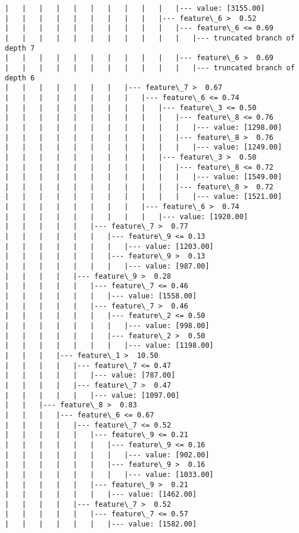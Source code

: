 \documentclass[11pt]{article}
\begin{document}
\begin{Verbatim}[commandchars=\\\{\}]
|   |   |   |   |   |   |   |   |   |   |--- value: [3155.00]
|   |   |   |   |   |   |   |   |   |--- feature\_6 >  0.52
|   |   |   |   |   |   |   |   |   |   |--- feature\_6 <= 0.69
|   |   |   |   |   |   |   |   |   |   |   |--- truncated branch of depth 7
|   |   |   |   |   |   |   |   |   |   |--- feature\_6 >  0.69
|   |   |   |   |   |   |   |   |   |   |   |--- truncated branch of depth 6
|   |   |   |   |   |   |   |--- feature\_7 >  0.67
|   |   |   |   |   |   |   |   |--- feature\_6 <= 0.74
|   |   |   |   |   |   |   |   |   |--- feature\_3 <= 0.50
|   |   |   |   |   |   |   |   |   |   |--- feature\_8 <= 0.76
|   |   |   |   |   |   |   |   |   |   |   |--- value: [1298.00]
|   |   |   |   |   |   |   |   |   |   |--- feature\_8 >  0.76
|   |   |   |   |   |   |   |   |   |   |   |--- value: [1249.00]
|   |   |   |   |   |   |   |   |   |--- feature\_3 >  0.50
|   |   |   |   |   |   |   |   |   |   |--- feature\_8 <= 0.72
|   |   |   |   |   |   |   |   |   |   |   |--- value: [1549.00]
|   |   |   |   |   |   |   |   |   |   |--- feature\_8 >  0.72
|   |   |   |   |   |   |   |   |   |   |   |--- value: [1521.00]
|   |   |   |   |   |   |   |   |--- feature\_6 >  0.74
|   |   |   |   |   |   |   |   |   |--- value: [1920.00]
|   |   |   |   |   |--- feature\_7 >  0.77
|   |   |   |   |   |   |--- feature\_9 <= 0.13
|   |   |   |   |   |   |   |--- value: [1203.00]
|   |   |   |   |   |   |--- feature\_9 >  0.13
|   |   |   |   |   |   |   |--- value: [987.00]
|   |   |   |   |--- feature\_9 >  0.28
|   |   |   |   |   |--- feature\_7 <= 0.46
|   |   |   |   |   |   |--- value: [1558.00]
|   |   |   |   |   |--- feature\_7 >  0.46
|   |   |   |   |   |   |--- feature\_2 <= 0.50
|   |   |   |   |   |   |   |--- value: [998.00]
|   |   |   |   |   |   |--- feature\_2 >  0.50
|   |   |   |   |   |   |   |--- value: [1198.00]
|   |   |   |--- feature\_1 >  10.50
|   |   |   |   |--- feature\_7 <= 0.47
|   |   |   |   |   |--- value: [787.00]
|   |   |   |   |--- feature\_7 >  0.47
|   |   |   |   |   |--- value: [1097.00]
|   |   |--- feature\_8 >  0.83
|   |   |   |--- feature\_6 <= 0.67
|   |   |   |   |--- feature\_7 <= 0.52
|   |   |   |   |   |--- feature\_9 <= 0.21
|   |   |   |   |   |   |--- feature\_9 <= 0.16
|   |   |   |   |   |   |   |--- value: [902.00]
|   |   |   |   |   |   |--- feature\_9 >  0.16
|   |   |   |   |   |   |   |--- value: [1033.00]
|   |   |   |   |   |--- feature\_9 >  0.21
|   |   |   |   |   |   |--- value: [1462.00]
|   |   |   |   |--- feature\_7 >  0.52
|   |   |   |   |   |--- feature\_7 <= 0.57
|   |   |   |   |   |   |--- value: [1582.00]

\end{Verbatim}
\end{document}
